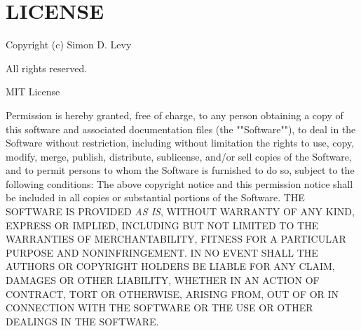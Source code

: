 \chapter{LICENSE}
\hypertarget{md__face___access__inferencing_2src_2edge-impulse-sdk_2classifier_2postprocessing_2tiny_e_k_f_2_l_i_c_e_n_s_e}{}\label{md__face___access__inferencing_2src_2edge-impulse-sdk_2classifier_2postprocessing_2tiny_e_k_f_2_l_i_c_e_n_s_e}

Copyright (c) Simon D. Levy

All rights reserved.

MIT License

Permission is hereby granted, free of charge, to any person obtaining a copy of this software and associated documentation files (the "{}"{}Software"{}"{}), to deal in the Software without restriction, including without limitation the rights to use, copy, modify, merge, publish, distribute, sublicense, and/or sell copies of the Software, and to permit persons to whom the Software is furnished to do so, subject to the following conditions\+: The above copyright notice and this permission notice shall be included in all copies or substantial portions of the Software. THE SOFTWARE IS PROVIDED {\itshape AS IS}, WITHOUT WARRANTY OF ANY KIND, EXPRESS OR IMPLIED, INCLUDING BUT NOT LIMITED TO THE WARRANTIES OF MERCHANTABILITY, FITNESS FOR A PARTICULAR PURPOSE AND NONINFRINGEMENT. IN NO EVENT SHALL THE AUTHORS OR COPYRIGHT HOLDERS BE LIABLE FOR ANY CLAIM, DAMAGES OR OTHER LIABILITY, WHETHER IN AN ACTION OF CONTRACT, TORT OR OTHERWISE, ARISING FROM, OUT OF OR IN CONNECTION WITH THE SOFTWARE OR THE USE OR OTHER DEALINGS IN THE SOFTWARE. 